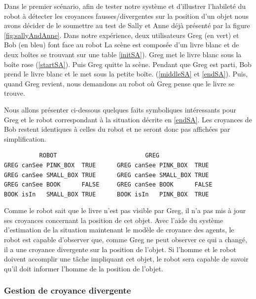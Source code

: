 \documentclass[a4paper,11pt,twoside]{StyleThese}
\begin{document}
Dans le premier scénario, afin de tester notre système et d'illustrer l'habileté du robot à détecter les croyances fausses/divergentes sur la position d'un objet nous avons décider de le soumettre au test de Sally et Anne déjà présenté par la figure \ref{fig:sallyAndAnne}. Dans notre expérience, deux utilisateurs Greg (en vert) et Bob (en bleu) font face au robot
La scène est composée d'un livre blanc et de deux boîtes se trouvant sur une table \ref{initSA}).
Greg met le livre blanc sous la boîte rose (\ref{startSA}). Puis Greg quitte la scène. Pendant que Greg est parti, Bob prend le livre blanc et le met sous la petite boîte. (\ref{middleSA} et \ref{endSA}).
Puis, quand Greg revient, nous demandons au robot où Greg pense que le livre se trouve.





Nous allons présenter ci-dessous quelques faits symboliques intéressants pour Greg et le robot correspondant à la situation décrite en \ref{endSA}. Les croyances de Bob restent identiques à celles du robot et ne seront donc pas affichées par simplification.
\begin{scriptsize}
\begin{verbatim}
          ROBOT                         GREG
GREG canSee PINK_BOX  TRUE      GREG canSee PINK_BOX  TRUE
GREG canSee SMALL_BOX TRUE      GREG canSee SMALL_BOX TRUE
GREG canSee BOOK      FALSE     GREG canSee BOOK      FALSE
BOOK isIn   SMALL_BOX TRUE      BOOK isIn   PINK_BOX  TRUE

\end{verbatim}
\end{scriptsize}

Comme le robot sait que le livre n'est pas visible par Greg, il n'a pas mis à jour ses croyances concernant la position de cet objet. Avec l'aide du système d'estimation de la situation maintenant le modèle de croyance des agents, le robot est capable d'observer que, comme Greg ne peut observer ce qui a changé, il a une croyance divergente sur la position de l'objet. Si l'homme et le robot doivent accomplir une tâche impliquant cet objet, le robot sera capable de savoir qu'il doit informer l'homme de la position de l'objet.

\subsubsection{Gestion de croyance divergente}
\end{document}

